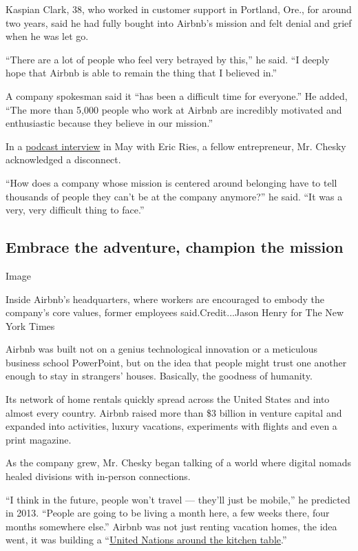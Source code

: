 Kaspian Clark, 38, who worked in customer support in Portland, Ore., for
around two years, said he had fully bought into Airbnb's mission and
felt denial and grief when he was let go.

``There are a lot of people who feel very betrayed by this,'' he said.
``I deeply hope that Airbnb is able to remain the thing that I believed
in.''

A company spokesman said it ``has been a difficult time for everyone.''
He added, ``The more than 5,000 people who work at Airbnb are incredibly
motivated and enthusiastic because they believe in our mission.''

In a
\href{https://podcasts.apple.com/us/podcast/brian-chesky-part-one-the-heros-journey/id1505392824?i=1000475093717}{podcast
interview} in May with Eric Ries, a fellow entrepreneur, Mr. Chesky
acknowledged a disconnect.

``How does a company whose mission is centered around belonging have to
tell thousands of people they can't be at the company anymore?'' he
said. ``It was a very, very difficult thing to face.''

\hypertarget{embrace-the-adventure-champion-the-mission}{%
\subsection{Embrace the adventure, champion the
mission}\label{embrace-the-adventure-champion-the-mission}}

Image

Inside Airbnb's headquarters, where workers are encouraged to embody the
company's core values, former employees said.Credit...Jason Henry for
The New York Times

Airbnb was built not on a genius technological innovation or a
meticulous business school PowerPoint, but on the idea that people might
trust one another enough to stay in strangers' houses. Basically, the
goodness of humanity.

Its network of home rentals quickly spread across the United States and
into almost every country. Airbnb raised more than \$3 billion in
venture capital and expanded into activities, luxury vacations,
experiments with flights and even a print magazine.

As the company grew, Mr. Chesky began talking of a world where digital
nomads healed divisions with in-person connections.

``I think in the future, people won't travel --- they'll just be
mobile,'' he predicted in 2013. ``People are going to be living a month
here, a few weeks there, four months somewhere else.'' Airbnb was not
just renting vacation homes, the idea went, it was building a
``\href{https://slate.com/business/2014/02/airbnb-gentrification-how-the-sharing-economy-drives-up-housing-prices.html}{United
Nations around the kitchen table}.''

